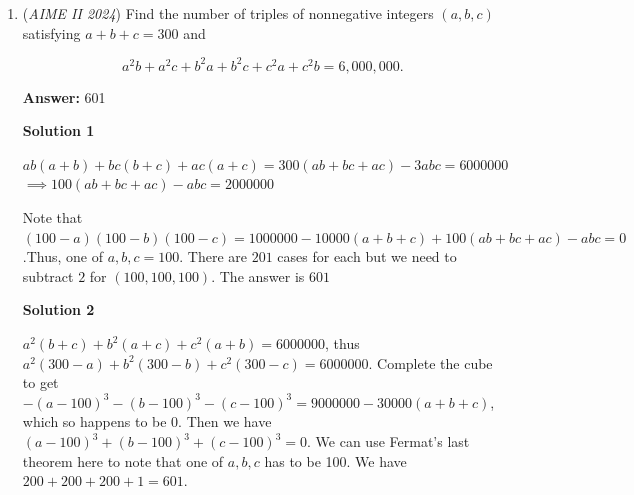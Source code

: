 \begin{enumerate}
 Using Lemma 1, we get $AB \cdot AC + DB \cdot DC = AE \cdot AD + AD \cdot ED = AD(AE + ED) = AD(AD) = AD^2$. $\square$

 By the Incenter-Excenter Lemma, we know $DB = DI = DC \implies DB \cdot DC = DI \cdot DI = DI^2 \implies AB \cdot AC = AD^2 - DB \cdot DC = AD^2 - DI^2$ so we seek the value of $AD^2 - DI^2$.

 $\textbf{Claim}$: $I$ is the midpoint of $AD$
$\textbf{Proof}$: $A$ and $D$ are on the circle with circumcenter $O$ so $OA = OD \implies \triangle OAD$ is isosceles and as $\overline{IA} \perp \overline{OI} \implies I$ is the midpoint. $\square$

 Let $AI = ID = x \implies AD^2 - DI^2 = (2x)^2 - x^2 = 4x^2 - x^2 = 3x^2$.

 By Euler's Formula for the square of the distance between the incenter and the circumcenter, we know

 $OI^2 = R(R - 2r) = 13(13 - 2 \cdot 6) = 13(13 - 12) = 13$.

 Since $\triangle ODI$ is right, by Pythagorean Theorem we get $DI^2 = x^2 = OD^2 - OI^2 = 13^2 - 13 = 169 - 13 = 156$ so the answer is $3x^2 = 3 \cdot 156 = \boxed{468}$



	\item (\textit{AIME II 2024}) Find the number of triples of nonnegative integers $(a, b, c)$ satisfying $a + b + c = 300$ and 


 
 \[a^2 b + a^2 c + b^2 a + b^2 c + c^2 a + c^2 b = 6,000,000.\]

 \textbf{Answer: }601



\textbf{Solution 1}

$ab(a+b)+bc(b+c)+ac(a+c)=300(ab+bc+ac)-3abc=6000000$$\implies 100(ab+bc+ac)-abc=2000000$

 Note that $(100-a)(100-b)(100-c)=1000000-10000(a+b+c)+100(ab+bc+ac)-abc=0$.Thus, one of $a, b, c =100$. There are $201$ cases for each but we need to subtract $2$ for $(100,100,100)$. The answer is $\boxed{601}$




\textbf{Solution 2}

$a^2(b+c)+b^2(a+c)+c^2(a+b) = 6000000$, thus $a^2(300-a)+b^2(300-b)+c^2(300-c) = 6000000$. Complete the cube to get $-(a-100)^3-(b-100)^3-(c-100)^3 = 9000000-30000(a+b+c)$, which so happens to be 0. Then we have $(a-100)^3+(b-100)^3+(c-100)^3 = 0$. We can use Fermat's last theorem here to note that one of $a, b, c$ has to be 100. We have $200+200+200+1 = 601.$





\end{enumerate}
